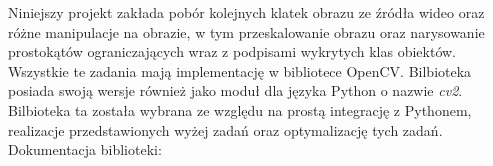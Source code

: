 Niniejszy projekt zakłada pobór kolejnych klatek obrazu ze źródła wideo oraz różne manipulacje na obrazie, w tym przeskalowanie obrazu oraz narysowanie prostokątów ograniczających wraz z podpisami wykrytych klas obiektów. Wszystkie te zadania mają implementację w bibliotece OpenCV. Bilbioteka posiada swoją wersje również jako moduł dla języka Python o nazwie \emph{cv2}. Bilbioteka ta została wybrana ze względu na prostą integrację z Pythonem, realizacje przedstawionych wyżej zadań oraz optymalizację tych zadań. Dokumentacja biblioteki: \cite{OpenCV_docs}

